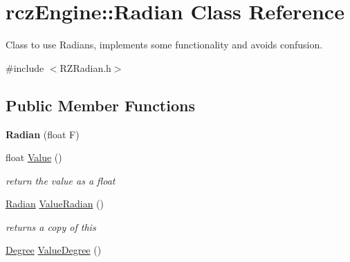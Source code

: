\hypertarget{classrcz_engine_1_1_radian}{}\section{rcz\+Engine\+:\+:Radian Class Reference}
\label{classrcz_engine_1_1_radian}


Class to use Radians, implements some functionality and avoids confusion.  




{\ttfamily \#include $<$R\+Z\+Radian.\+h$>$}

\subsection*{Public Member Functions}
\begin{DoxyCompactItemize}
\item 
\hypertarget{classrcz_engine_1_1_radian_ac29cd708316ec7517581146f99fe508f}{}{\bfseries Radian} (float F)\label{classrcz_engine_1_1_radian_ac29cd708316ec7517581146f99fe508f}

\item 
\hypertarget{classrcz_engine_1_1_radian_ae34b068f291c8de6342651670da8a49a}{}float \hyperlink{classrcz_engine_1_1_radian_ae34b068f291c8de6342651670da8a49a}{Value} ()\label{classrcz_engine_1_1_radian_ae34b068f291c8de6342651670da8a49a}

\begin{DoxyCompactList}\small\item\em return the value as a float \end{DoxyCompactList}\item 
\hypertarget{classrcz_engine_1_1_radian_a233d57dd7c2fc993cc9c3ad06f934ab1}{}\hyperlink{classrcz_engine_1_1_radian}{Radian} \hyperlink{classrcz_engine_1_1_radian_a233d57dd7c2fc993cc9c3ad06f934ab1}{Value\+Radian} ()\label{classrcz_engine_1_1_radian_a233d57dd7c2fc993cc9c3ad06f934ab1}

\begin{DoxyCompactList}\small\item\em returns a copy of this \end{DoxyCompactList}\item 
\hypertarget{classrcz_engine_1_1_radian_a372c40425ce5c349ef989be0014d4cd8}{}\hyperlink{classrcz_engine_1_1_degree}{Degree} \hyperlink{classrcz_engine_1_1_radian_a372c40425ce5c349ef989be0014d4cd8}{Value\+Degree} ()\label{classrcz_engine_1_1_radian_a372c40425ce5c349ef989be0014d4cd8}


\end{DoxyCompactItemize}
